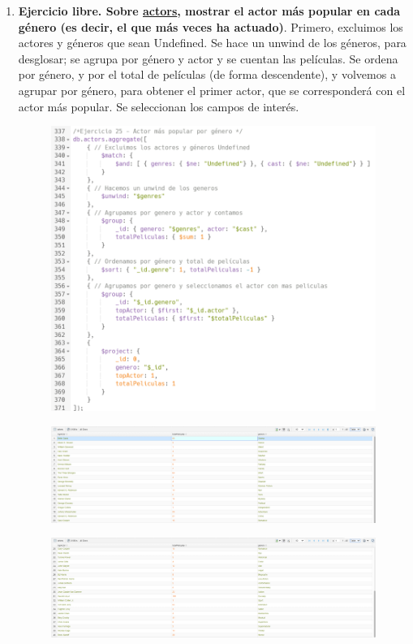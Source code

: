 \documentclass[a4paper,onecolumn]{article}
\begin{document}
\begin{sloppypar}
\begin{enumerate}
\begin{figure}[H]
\begin{subfigure}[b]{0.4\textwidth}
        \end{subfigure}
   \end{figure}
    \item \textbf{Ejercicio libre. Sobre \underline{actors}, mostrar el actor más popular en cada género (es decir, el que más veces ha actuado)}. 
    Primero, excluimos los actores y géneros que sean Undefined. Se hace un unwind de los géneros, para desglosar; se agrupa por género y actor y se cuentan las películas.
    Se ordena por género, y por el total de películas (de forma descendente), y volvemos a agrupar por género, para obtener el primer actor, que se corresponderá con el actor más popular.
    Se seleccionan los campos de interés.
    \begin{figure}[H]
        \includegraphics[width=0.6\linewidth]{querys/25_query.png}
    \end{figure}
    \begin{figure}[H]
            \centering
            \includegraphics[width=\textwidth]{querys/25_result1.png}
    \end{figure}
    \begin{figure}[H]
            \includegraphics[width=\textwidth]{querys/25_result2.png}

\end{figure}
\end{enumerate}
\end{sloppypar}
\end{document}
